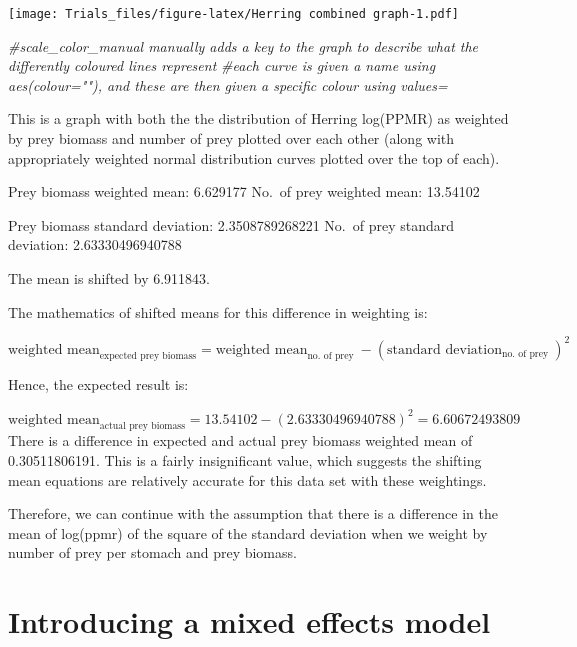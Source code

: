\documentclass[
]{article}
\newenvironment{Shaded}{\begin{snugshade}}{\end{snugshade}}
\newcommand{\CommentTok}[1]{\textcolor[rgb]{0.56,0.35,0.01}{\textit{#1}}}
\begin{document}
\texttt{[image: Trials\_files/figure-latex/Herring combined graph-1.pdf]}

\begin{Shaded}
\begin{Highlighting}[]
\CommentTok{\#scale\_color\_manual manually adds a key to the graph to describe what the differently coloured lines represent}
\CommentTok{\#each curve is given a name using \textquotesingle{}aes(colour="")\textquotesingle{}, and these are then given a specific colour using \textquotesingle{}values=\textquotesingle{}}
\end{Highlighting}
\end{Shaded}

This is a graph with both the the distribution of Herring log(PPMR) as
weighted by prey biomass and number of prey plotted over each other
(along with appropriately weighted normal distribution curves plotted
over the top of each).

Prey biomass weighted mean: 6.629177 No.~of prey weighted mean: 13.54102

Prey biomass standard deviation: 2.3508789268221 No.~of prey standard
deviation: 2.63330496940788

The mean is shifted by 6.911843.

The mathematics of shifted means for this difference in weighting is:

\[
  \text{weighted mean}_{\text{expected prey biomass}} = \text{weighted mean}_{\text{no. of prey }} - (\text{standard deviation}_{\text{no. of prey }})^2
\]

Hence, the expected result is:

\[
  \text{weighted mean}_{\text{actual prey biomass}} = 13.54102 - (2.63330496940788)^2 = 6.60672493809
\] There is a difference in expected and actual prey biomass weighted
mean of 0.30511806191. This is a fairly insignificant value, which
suggests the shifting mean equations are relatively accurate for this
data set with these weightings.

Therefore, we can continue with the assumption that there is a
difference in the mean of log(ppmr) of the square of the standard
deviation when we weight by number of prey per stomach and prey biomass.

\hypertarget{introducing-a-mixed-effects-model}{%
\section{Introducing a mixed effects
model}\label{introducing-a-mixed-effects-model}}
\end{document}
